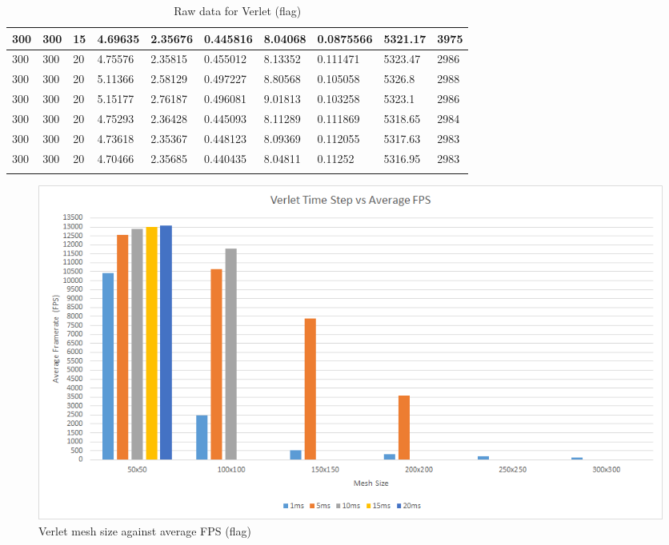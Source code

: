 \begin{landscape}
\begin{longtable}{ | l | l | l | l | l | l | l | l | l | l | }
300 & 300 & 15 & 4.69635 & 2.35676 & 0.445816 & 8.04068 & 0.0875566 & 5321.17 & 3975\\ \hline
300 & 300 & 20 & 4.75576 & 2.35815 & 0.455012 & 8.13352 & 0.111471 & 5323.47 & 2986\\ \hline
300 & 300 & 20 & 5.11366 & 2.58129 & 0.497227 & 8.80568 & 0.105058 & 5326.8 & 2988\\ \hline
300 & 300 & 20 & 5.15177 & 2.76187 & 0.496081 & 9.01813 & 0.103258 & 5323.1 & 2986\\ \hline
300 & 300 & 20 & 4.75293 & 2.36428 & 0.445093 & 8.11289 & 0.111869 & 5318.65 & 2984\\ \hline
300 & 300 & 20 & 4.73618 & 2.35367 & 0.448123 & 8.09369 & 0.112055 & 5317.63 & 2983\\ \hline
300 & 300 & 20 & 4.70466 & 2.35685 & 0.440435 & 8.04811 & 0.11252 & 5316.95 & 2983\\ \hline
  \caption{Raw data for Verlet (flag)}
    \label{tab:v raw flag}
\end{longtable}

    \begin{figure}[!htb]
    \begin{center}
      \includegraphics[scale=0.95]{Figures/flag_v_fps}
    \end{center}
    \caption{Verlet mesh size against average FPS (flag)}
    \label{fig:v fps flag}
  \end{figure}
\end{landscape}
  
